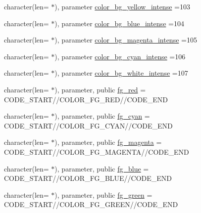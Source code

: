 \begin{DoxyCompactItemize}
\item 
character(len= $\ast$), parameter \mbox{\hyperlink{namespacem__escape_a79f01235a5d3b2ea250274a7ca1c2c43}{color\+\_\+bg\+\_\+yellow\+\_\+intense}} =\textquotesingle{}103\textquotesingle{}
\item 
character(len= $\ast$), parameter \mbox{\hyperlink{namespacem__escape_aac30abbb8eb6e1570e28dac2326113a7}{color\+\_\+bg\+\_\+blue\+\_\+intense}} =\textquotesingle{}104\textquotesingle{}
\item 
character(len= $\ast$), parameter \mbox{\hyperlink{namespacem__escape_af148e03515e36ed552e330ba495bcbba}{color\+\_\+bg\+\_\+magenta\+\_\+intense}} =\textquotesingle{}105\textquotesingle{}
\item 
character(len= $\ast$), parameter \mbox{\hyperlink{namespacem__escape_a6be9fe26e904b8714e035412ae4e6ad4}{color\+\_\+bg\+\_\+cyan\+\_\+intense}} =\textquotesingle{}106\textquotesingle{}
\item 
character(len= $\ast$), parameter \mbox{\hyperlink{namespacem__escape_af57687b3c8741aaab4c67bc1c697aeda}{color\+\_\+bg\+\_\+white\+\_\+intense}} =\textquotesingle{}107\textquotesingle{}
\item 
character(len= $\ast$), parameter, public \mbox{\hyperlink{namespacem__escape_a615ac74b8d93904b5fb35fd656f18aa3}{fg\+\_\+red}} = C\+O\+D\+E\+\_\+\+S\+T\+A\+RT//C\+O\+L\+O\+R\+\_\+\+F\+G\+\_\+\+R\+ED//C\+O\+D\+E\+\_\+\+E\+ND
\item 
character(len= $\ast$), parameter, public \mbox{\hyperlink{namespacem__escape_abdd10ab49027c01752c5a165d42dca95}{fg\+\_\+cyan}} = C\+O\+D\+E\+\_\+\+S\+T\+A\+RT//C\+O\+L\+O\+R\+\_\+\+F\+G\+\_\+\+C\+Y\+AN//C\+O\+D\+E\+\_\+\+E\+ND
\item 
character(len= $\ast$), parameter, public \mbox{\hyperlink{namespacem__escape_a44464db3bf2f3277b04e505bf79061a4}{fg\+\_\+magenta}} = C\+O\+D\+E\+\_\+\+S\+T\+A\+RT//C\+O\+L\+O\+R\+\_\+\+F\+G\+\_\+\+M\+A\+G\+E\+N\+TA//C\+O\+D\+E\+\_\+\+E\+ND
\item 
character(len= $\ast$), parameter, public \mbox{\hyperlink{namespacem__escape_a94792b1429eb9880530d93643e9ce22c}{fg\+\_\+blue}} = C\+O\+D\+E\+\_\+\+S\+T\+A\+RT//C\+O\+L\+O\+R\+\_\+\+F\+G\+\_\+\+B\+L\+UE//C\+O\+D\+E\+\_\+\+E\+ND
\item 
character(len= $\ast$), parameter, public \mbox{\hyperlink{namespacem__escape_a1ada5ca3807f86e47be0b48c41e410c7}{fg\+\_\+green}} = C\+O\+D\+E\+\_\+\+S\+T\+A\+RT//C\+O\+L\+O\+R\+\_\+\+F\+G\+\_\+\+G\+R\+E\+EN//C\+O\+D\+E\+\_\+\+E\+ND
\item 

\end{DoxyCompactItemize}
